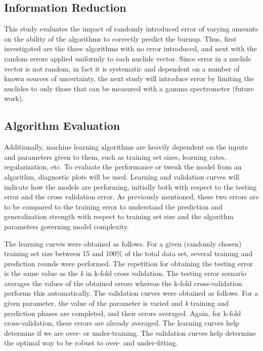 \documentclass{anstrans}
\begin{document}
\subsection{Information Reduction}

This study evaluates the impact of randomly introduced error of varying amounts
on the ability of the algorithms to correctly predict the burnup. Thus, first
investigated are the three algorithms with no error introduced, and next with
the random errors applied uniformly to each nuclide vector. Since error in a
nuclide vector is not random, in fact it is systematic and dependent on a
number of known sources of uncertainty, the next study will introduce error by
limiting the nuclides to only those that can be measured with a gamma
spectrometer (future work).

\subsection{Algorithm Evaluation}

Additionally, machine learning algorithms are heavily dependent on the inputs
and parameters given to them, such as training set sizes, learning rates,
regularization, etc. To evaluate the performance or tweak the model from an
algorithm, diagnostic plots will be used. Learning and validation curves will
indicate how the models are performing, initially both with respect to the
testing error and the cross validation error. As previously mentioned, these
two errors are to be compared to the training error to understand the
prediction and generalization strength with respect to training set size and
the algorithm parameters governing model complexity. 

The learning curves were obtained as follows. For a given (randomly chosen)
training set size between 15 and 100\% of the total data set, several training
and prediction rounds were performed. The repetition for obtaining the testing
error is the same value as the \textit{k} in k-fold cross validation. The
testing error scenario averages the values of the obtained errors whereas the
k-fold cross-validation performs this automatically.  The validation curves
were obtained as follows. For a given parameter, the value of the parameter is
varied and \textit{k} training and prediction phases are completed, and their
errors averaged. Again, for k-fold cross-validation, these errors are already
averaged. The learning curves help determine if we are over- or under-training.
The validation curves help determine the optimal way to be robust to over- and
under-fitting. 
\end{document}
